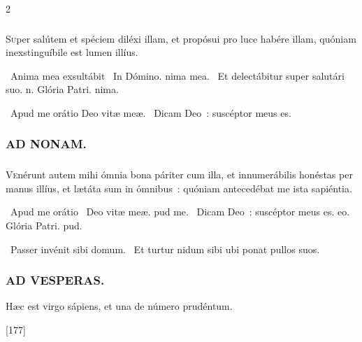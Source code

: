 \documentclass[9pt,twoside]{extarticle}
\begin{document}
\begin{multicols}{2}
{\subsubsection*{}
\lettrine{S}uper salútem et spéciem diléxi illam, et propósui pro luce habére illam, quóniam inexstinguíbile est lumen illíus.

\begin{tightlist}{}
\item {}~Anima mea exsultábit \textred{*}~In Dómino. nima mea. ~Et delectábitur super salutári suo. n. Glória Patri. nima.
\item {}~Apud me orátio Deo vitæ meæ. ~Dicam Deo~: suscéptor meus es.
\end{tightlist}

\subsubsection*{\center \textsc{AD NONAM.}}
\subsubsection*{}
\lettrine{V}enérunt autem mihi ómnia bona páriter cum illa, et innumerábilis honéstas per manus illíus, et lætáta sum in ómnibus~: quóniam antecedébat me ista sapiéntia.

\begin{tightlist}{}
\item {}~Apud me orátio \textred{*}~Deo vitæ meæ. pud me. ~Dicam Deo~: suscéptor meus es. eo. Glória Patri. pud.
\item {}~Passer invénit sibi domum. ~Et turtur nidum sibi ubi ponat pullos suos.
\end{tightlist}

\subsubsection*{\center \textsc{AD VESPERAS.}}
\begin{tightlist}{}
\item {} Hæc est virgo sápiens, et una de número prudéntum. 
\item {} [177]
\end{tightlist}

}
\end{multicols}
\end{document}
